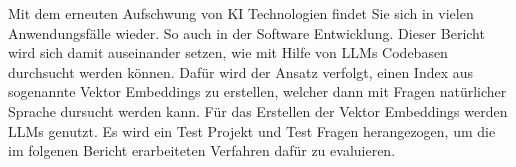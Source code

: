 \documentclass[../main.tex]{subfiles}
\begin{document}
Mit dem erneuten Aufschwung von KI Technologien findet Sie sich in vielen Anwendungsfälle wieder.
So auch in der Software Entwicklung.
Dieser Bericht wird sich damit auseinander setzen, wie mit Hilfe von \glspl{LLM} Codebasen durchsucht werden können.
Dafür wird der Ansatz verfolgt, einen Index aus sogenannte Vektor Embeddings zu erstellen, welcher dann mit Fragen natürlicher Sprache dursucht werden kann.
Für das Erstellen der Vektor Embeddings werden \glspl{LLM} genutzt.
Es wird ein Test Projekt und Test Fragen herangezogen, um die im folgenen Bericht erarbeiteten Verfahren dafür zu evaluieren.
\end{document}
